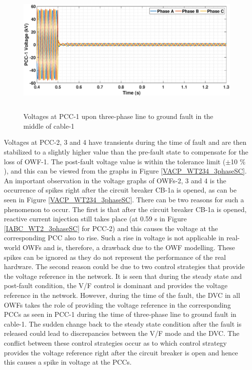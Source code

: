 \begin{figure}[H]
    \includegraphics[height = 6.5cm,width = \textwidth]{Diagrams/Chapter_5/VABC_WT1_3phaseSC.eps}
    \caption{Voltages at PCC-1 upon three-phase line to ground fault in the middle of cable-1}
    \label{VABC_WT1_3phaseSC}
\end{figure}

Voltages at \gls{PCC}-2, 3 and 4 have transients during the time of fault and are then stabilized to a slightly higher value than the pre-fault state to compensate for the loss of \gls{OWF}-1. The post-fault voltage value is within the tolerance limit ($\pm$10 \% ), and this can be viewed from the graphs in Figure \ref{VACP_WT234_3phaseSC}. An important observation in the voltage graphs of \gls{OWF}s-2, 3 and 4 is the occurrence of spikes right after the circuit breaker CB-1a is opened, as can be seen in Figure \ref{VACP_WT234_3phaseSC}. 
There can be two reasons for such a phenomenon to occur. The first is that after the circuit breaker CB-1a is opened, reactive current injection still takes place (at 0.59 s in Figure \ref{IABC_WT2_3phaseSC} for \gls{PCC}-2) and this causes the voltage at the corresponding \gls{PCC} also to rise. Such a rise in voltage is not applicable in real-world \gls{OWF}s and is, therefore, a drawback due to the \gls{OWF} modelling. These spikes can be ignored as they do not represent the performance of the real hardware. The second reason could be due to two control strategies that provide the voltage reference in the network. It is seen that during the steady state and post-fault condition, the V/F control is dominant and provides the voltage reference in the network. However, during the time of the fault, the \gls{DVC} in all \gls{OWF}s takes the role of providing the voltage reference in the corresponding \gls{PCC}s as seen in \gls{PCC}-1 during the time of three-phase line to ground fault in cable-1. The sudden change back to the steady state condition after the fault is released could lead to discrepancies between the V/F mode and the \gls{DVC}. The conflict between these control strategies occur as to which control strategy provides the voltage reference right after the circuit breaker is open and hence this causes a spike in voltage at the \gls{PCC}s.

